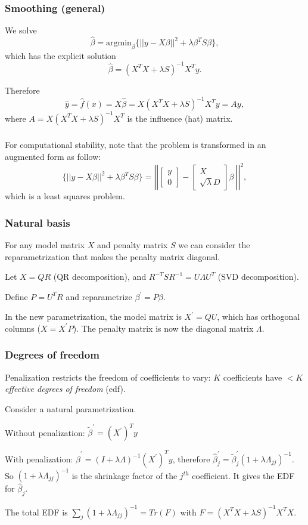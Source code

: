 \documentclass{beamer}
\newcommand{\bs}{\bigskip}
\begin{document}
\begin{frame}
\frametitle{Smoothing (general)}
We solve
 $$\hat{\beta} = \mbox{argmin}_{\beta} \{  ||y - X \beta ||^2 + \lambda  \beta^T S \beta \},$$
which has the explicit solution
 $$\hat{\beta} = (X^T X + \lambda S)^{-1} X^T y.$$
 
\bs
Therefore 
$$ \hat{y} = \hat{f}(x) = X \hat{\beta} = X (X^T X + \lambda S)^{-1} X^T y = A y,$$
where $A= X (X^T X + \lambda S)^{-1} X^T$ is the influence (hat) matrix. 

\label{linear.smoother}

\end{frame}

\begin{frame}
\frametitle{}
For computational stability, note that the problem is transformed in an augmented form as follow:
 $$\{  ||y - X \beta ||^2 + \lambda  \beta^T S \beta \} = \left|\left| \left[
 \begin{array}{c}
y \\
0
\end{array}
 \right] - \left[
 \begin{array}{c}
 X  \\
 \sqrt{\lambda} D
  \end{array}
 \right] \beta \ 
  \right|\right|^2,$$
which is a least squares problem.
\end{frame}


\begin{frame}
\frametitle{Natural basis}

For any model matrix $X$ and penalty matrix $S$ we can consider the
reparametrization that makes the penalty matrix diagonal.

\bs
Let $X= Q R$ (QR decomposition), and $R^{-T} S R^{-1} = U \Lambda U^{T}$ (SVD
decomposition).

\bs
Define $P = U^T R$ and reparametrize $\beta^{\prime} = P \beta$.

\bs 
In the new parametrization, the model matrix is $X^{\prime} = Q U$, which has
orthogonal columns ($X = X^{\prime}P$). The penalty matrix is now the diagonal
matrix $\Lambda$.
\end{frame}


\begin{frame}
\frametitle{Degrees of freedom}
Penalization restricts the freedom of coefficients to vary: $K$ coefficients have
$< K$ \textit{effective degrees of freedom} (edf).

\bs 
Consider a natural parametrization. 

\bs 
Without penalization: $ \tilde{\beta}^{\prime} =  ( X^{\prime} )^T  y$
 
With penalization: $\hat{\beta}^{\prime} = (I + \lambda \Lambda)^{-1}  ( X^{\prime} )^T
y$, therefore $\hat{\beta}_j ^\prime = 
\tilde{\beta}_j^\prime (1 +\lambda \Lambda_{jj})^{-1}$. So $(1 + \lambda \Lambda_{jj})^{-1}$ is the
shrinkage factor of the $j^{th}$ coefficient. It gives the EDF for
$\hat{\beta}_j$.

\bs
The total EDF is $\sum_{j} (1 + \lambda  \Lambda_{jj})^{-1} = Tr(F)$ with $F = (X^T X +
\lambda S)^{-1} X^T X$. 
\end{frame}
\end{document}
